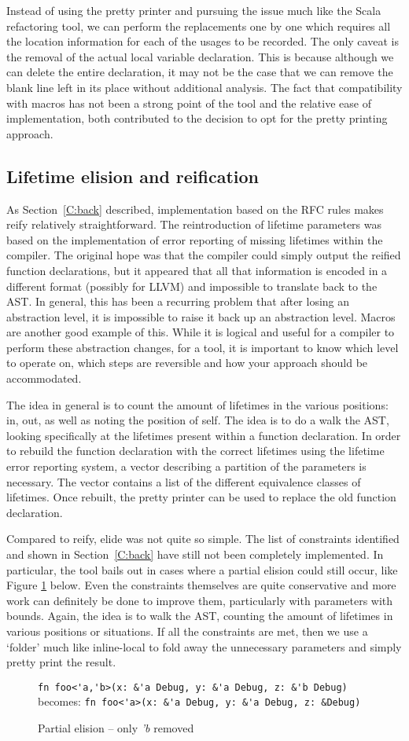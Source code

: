 Instead of using the pretty printer and pursuing the issue much like the Scala refactoring tool, we can perform the replacements one by one which requires all the location information for each of the usages to be recorded. The only caveat is the removal of the actual local variable declaration. This is because although we can delete the entire declaration, it may not be the case that we can remove the blank line left in its place without additional analysis. The fact that compatibility with macros has not been a strong point of the tool and the relative ease of implementation, both contributed to the decision to opt for the pretty printing approach.

\subsection{Lifetime elision and reification}

As Section~\ref{C:back} described, implementation based on the RFC rules makes reify relatively straightforward. The reintroduction of lifetime parameters was based on the implementation of error reporting of missing lifetimes within the compiler. The original hope was that the compiler could simply output the reified function declarations, but it appeared that all that information is encoded in a different format (possibly for LLVM) and impossible to translate back to the AST. In general, this has been a recurring problem that after losing an abstraction level, it is impossible to raise it back up an abstraction level. Macros are another good example of this. While it is logical and useful for a compiler to perform these abstraction changes, for a tool, it is important to know which level to operate on, which steps are reversible and how your approach should be accommodated.

The idea in general is to count the amount of lifetimes in the various positions: in, out, as well as noting the position of self. The idea is to do a walk the AST, looking specifically at the lifetimes present within a function declaration. In order to rebuild the function declaration with the correct lifetimes using the lifetime error reporting system, a vector describing a partition of the parameters is necessary. The vector contains a list of the different equivalence classes of lifetimes. Once rebuilt, the pretty printer can be used to replace the old function declaration.

Compared to reify, elide was not quite so simple. The list of constraints identified and shown in Section~\ref{C:back} have still not been completely implemented. In particular, the tool bails out in cases where a partial elision could still occur, like Figure \ref{Fig:partial} below. Even the constraints themselves are quite conservative and more work can definitely be done to improve them, particularly with parameters with bounds. Again, the idea is to walk the AST, counting the amount of lifetimes in various positions or situations. If all the constraints are met, then we use a `folder' much like inline-local to fold away the unnecessary parameters and simply pretty print the result.

\begin{figure}[h]
{\verb|fn foo<'a,'b>(x: &'a Debug, y: &'a Debug, z: &'b Debug)|}\newline
becomes:\newline
{\verb|fn foo<'a>(x: &'a Debug, y: &'a Debug, z: &Debug)|}
\caption{Partial elision -- only \emph{'b} removed}
\label{Fig:partial}
\end{figure}

